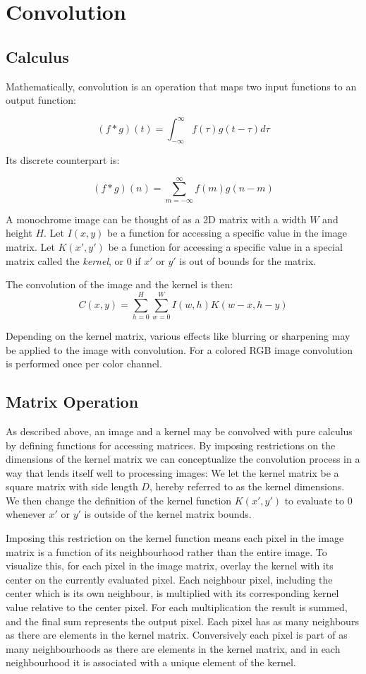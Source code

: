 \section{Convolution}
\subsection{Calculus}
Mathematically, convolution is an operation that maps two input functions to an output function:

\[
    (f * g)(t) = \int^{\infty}_{-\infty}{f(\tau)g(t-\tau) d\tau}
\]

Its discrete counterpart is:

\[
    (f * g)(n) = \sum^{\infty}_{m=-\infty}{f(m)g(n-m)}
\]

A monochrome image can be thought of as a 2D matrix with a width $W$ and height $H$.
Let $I(x, y)$ be a function for accessing a specific value in the image matrix.
Let $K(x', y')$ be a function for accessing a specific value in a special matrix called the \textit{kernel},
or $0$ if $x'$ or $y'$ is out of bounds for the matrix.

The convolution of the image and the kernel is then:
\[
    C(x, y) = \sum^{H}_{h=0} \sum^{W}_{w=0}{I(w, h)K(w - x, h -y)}
\]

Depending on the kernel matrix,
various effects like blurring or sharpening may be applied to the image with convolution.
For a colored RGB image convolution is performed once per color channel.

\subsection{Matrix Operation}
As described above, an image and a kernel may be convolved with pure calculus by defining functions for accessing matrices.
By imposing restrictions on the dimensions of the kernel matrix we can conceptualize the convolution process in a way that lends itself well to processing images:
We let the kernel matrix be a square matrix with side length $D$, hereby referred to as the kernel dimensions.
We then change the definition of the kernel function $K(x', y')$ to evaluate to $0$ whenever $x'$ or $y'$ is outside of the kernel matrix bounds.

Imposing this restriction on the kernel function means each pixel in the image matrix is a function of its neighbourhood rather than the entire image.
To visualize this, for each pixel in the image matrix, overlay the kernel with its center on the currently evaluated pixel.
Each neighbour pixel, including the center which is its own neighbour, is multiplied with its corresponding kernel value relative to the center pixel.
For each multiplication the result is summed, and the final sum represents the output pixel.
Each pixel has as many neighbours as there are elements in the kernel matrix. 
Conversively each pixel is part of as many neighbourhoods as there are elements in the kernel matrix, and in each neighbourhood it is associated with a unique element of the kernel.

